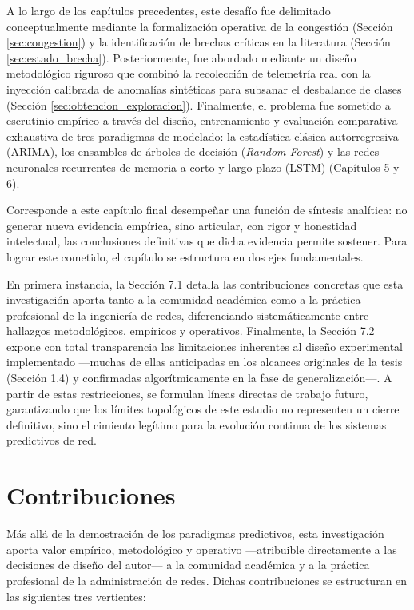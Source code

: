 \documentclass[12pt]{report}
\begin{document}
A lo largo de los capítulos precedentes, este desafío fue delimitado conceptualmente mediante la formalización operativa de la congestión (Sección \ref{sec:congestion}) y la identificación de brechas críticas en la literatura (Sección \ref{sec:estado_brecha}). Posteriormente, fue abordado mediante un diseño metodológico riguroso que combinó la recolección de telemetría real con la inyección calibrada de anomalías sintéticas para subsanar el desbalance de clases (Sección \ref{sec:obtencion_exploracion}). Finalmente, el problema fue sometido a escrutinio empírico a través del diseño, entrenamiento y evaluación comparativa exhaustiva de tres paradigmas de modelado: la estadística clásica autorregresiva (ARIMA), los ensambles de árboles de decisión (\textit{Random Forest}) y las redes neuronales recurrentes de memoria a corto y largo plazo (LSTM) (Capítulos 5 y 6).

Corresponde a este capítulo final desempeñar una función de síntesis analítica: no generar nueva evidencia empírica, sino articular, con rigor y honestidad intelectual, las conclusiones definitivas que dicha evidencia permite sostener. Para lograr este cometido, el capítulo se estructura en dos ejes fundamentales. 

En primera instancia, la Sección 7.1 detalla las contribuciones concretas que esta investigación aporta tanto a la comunidad académica como a la práctica profesional de la ingeniería de redes, diferenciando sistemáticamente entre hallazgos metodológicos, empíricos y operativos. Finalmente, la Sección 7.2 expone con total transparencia las limitaciones inherentes al diseño experimental implementado ---muchas de ellas anticipadas en los alcances originales de la tesis (Sección 1.4) y confirmadas algorítmicamente en la fase de generalización---. A partir de estas restricciones, se formulan líneas directas de trabajo futuro, garantizando que los límites topológicos de este estudio no representen un cierre definitivo, sino el cimiento legítimo para la evolución continua de los sistemas predictivos de red.

\section{Contribuciones}
\label{sec:contribuciones}

Más allá de la demostración de los paradigmas predictivos, esta investigación aporta valor empírico, metodológico y operativo ---atribuible directamente a las decisiones de diseño del autor--- a la comunidad académica y a la práctica profesional de la administración de redes. Dichas contribuciones se estructuran en las siguientes tres vertientes:
\end{document}
